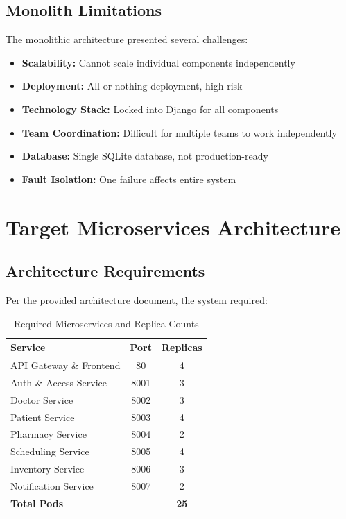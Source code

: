 \documentclass[12pt,a4paper]{article}
\begin{document}
\subsection{Monolith Limitations}
The monolithic architecture presented several challenges:
\begin{itemize}
    \item \textbf{Scalability:} Cannot scale individual components independently
    \item \textbf{Deployment:} All-or-nothing deployment, high risk
    \item \textbf{Technology Stack:} Locked into Django for all components
    \item \textbf{Team Coordination:} Difficult for multiple teams to work independently
    \item \textbf{Database:} Single SQLite database, not production-ready
    \item \textbf{Fault Isolation:} One failure affects entire system
\end{itemize}

\section{Target Microservices Architecture}

\subsection{Architecture Requirements}
Per the provided architecture document, the system required:

\begin{table}[h]
\centering
\begin{tabular}{@{}lcc@{}}
\toprule
\textbf{Service} & \textbf{Port} & \textbf{Replicas} \\
\midrule
API Gateway \& Frontend & 80 & 4 \\
Auth \& Access Service & 8001 & 3 \\
Doctor Service & 8002 & 3 \\
Patient Service & 8003 & 4 \\
Pharmacy Service & 8004 & 2 \\
Scheduling Service & 8005 & 4 \\
Inventory Service & 8006 & 3 \\
Notification Service & 8007 & 2 \\
\midrule
\textbf{Total Pods} & & \textbf{25} \\
\bottomrule
\end{tabular}
\caption{Required Microservices and Replica Counts}
\end{table}
\end{document}

